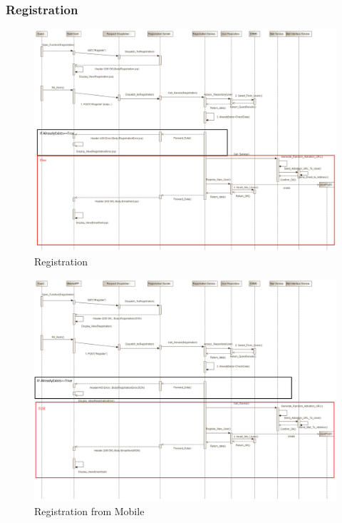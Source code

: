 \documentclass[12pt]{article}
\begin{document}
\subsubsection{Registration}
\begin{figure}[h]
	\centering
	\includegraphics[width=\textwidth]{../Images/Sequence_Final/Registration}
	\caption{Registration}
\end{figure}

\begin{figure}[h]
	\centering
	\includegraphics[width=\textwidth]{../Images/Sequence_Final/Registration_Mobile}
	\caption{Registration from Mobile}
\end{figure}
\end{document}
